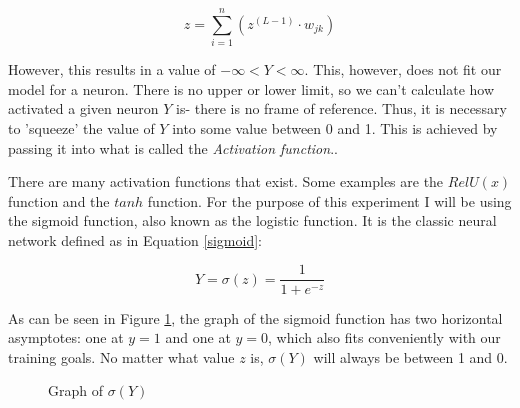 \documentclass[12pt]{article}
\begin{document}
        \begin{equation} \label{forwardpropequation}
            z = \sum_{i=1}^{n}(z^{(L-1)} \cdot  w_{jk})
        \end{equation}
        
        However, this results in a value of \begin{math} -\infty < Y < \infty \end{math}. This, however, does not fit our model for a neuron. There is no upper or lower limit, so we can't calculate how activated a given neuron \(Y\) is- there is no frame of reference. Thus, it is necessary to 'squeeze' the value of \(Y\) into some value between 0 and 1. This is achieved by passing it into what is called the \textit{Activation function}.\textcite{sharma2017}.

        There are many activation functions that exist. Some examples are the \(RelU(x)\) function and the \(tanh\) function. For the purpose of this experiment I will be using the sigmoid function, also known as the logistic function. It is the classic neural network \textcite{DeepLearningCh2} defined as in Equation \ref{sigmoid}:

        \begin{equation} \label{sigmoid} 
            Y = \sigma(z) = \frac{1}{1 + e ^ {-z}}
        \end{equation}
        
        
        As can be seen in Figure \ref{sigmoidgraph}, the graph of the sigmoid function has two horizontal asymptotes: one at \(y = 1\) and one at \(y = 0\), which also fits conveniently with our training goals. No matter what value $z$ is, \(\sigma(Y)\) will always be between 1 and 0.

        \begin{figure}[h]
            \centering
            \caption{Graph of $\sigma(Y)$} \label{sigmoidgraph}
        \end{figure}
\end{document}
